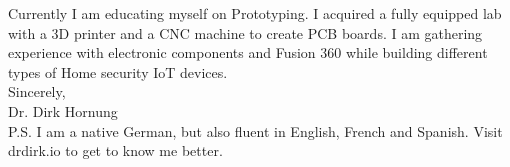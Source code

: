 \documentclass[11pt]{article}
\begin{document}
 \noindent Currently I am educating myself on Prototyping. I acquired a fully
 equipped lab with a 3D printer and a CNC machine to create PCB boards. I am
 gathering experience with electronic components and Fusion 360 while building
 different types of Home security IoT devices.\\

 \noindent Sincerely, \\
 Dr. Dirk Hornung \\

 \noindent P.S. I am a native German, but also fluent in English, French and
 Spanish. Visit drdirk.io to get to know me better.

 
\end{document}

